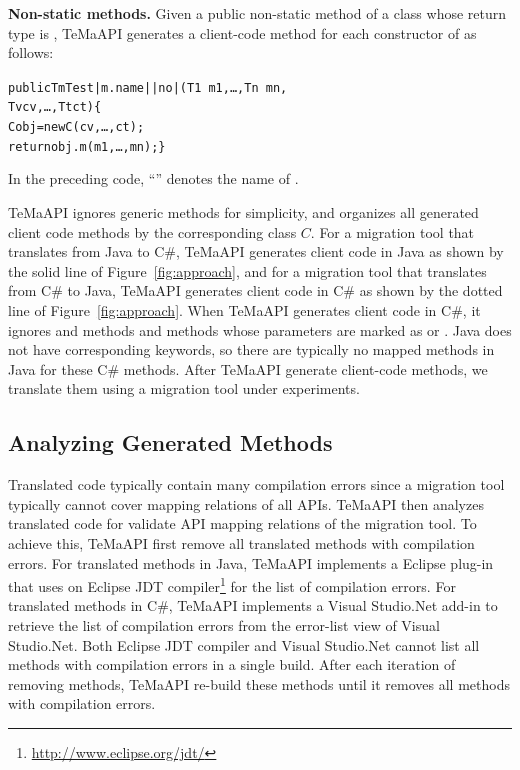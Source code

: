 \textbf{Non-static methods.} Given a public non-static method  of a class  whose return type is , TeMaAPI generates a client-code method for each constructor  of  as follows:
\begin{CodeOut}%
\begin{alltt}
 public Tm Test|m.name||no|(T1\ m1,\ldots, Tn\ mn, 
                            Tv cv, \ldots, Tt ct)\{
   C obj = new C(cv,\ldots, ct);                     
   return obj.m(m1,\ldots, mn); \}
\end{alltt}
\end{CodeOut}

In the preceding code, ``'' denotes the name of . 

TeMaAPI ignores generic methods for simplicity, and organizes all generated client code methods by the corresponding class $C$. For a migration tool that translates from Java to C\#, TeMaAPI generates client code in Java as shown by the solid line of Figure~\ref{fig:approach}, and for a migration tool that translates from C\# to Java, TeMaAPI generates client code in C\# as shown by the dotted line of Figure~\ref{fig:approach}. When TeMaAPI generates client code in C\#, it ignores  and  methods and methods whose parameters are marked as  or . Java does not have corresponding keywords, so there are typically no mapped methods in Java for these C\# methods. After TeMaAPI generate client-code methods, we translate them using a migration tool under experiments.


\subsection{Analyzing Generated Methods}
\label{sec:approach:analyzing}
Translated code typically contain many compilation errors since a migration tool typically cannot cover mapping relations of all APIs. TeMaAPI then analyzes translated code for validate API mapping relations of the migration tool. To achieve this, TeMaAPI first remove all translated methods with compilation errors. For translated methods in Java, TeMaAPI implements a Eclipse plug-in that uses on Eclipse JDT compiler\footnote{\url{http://www.eclipse.org/jdt/}} for the list of compilation errors. For translated methods in C\#, TeMaAPI implements a Visual Studio.Net add-in to retrieve the list of compilation errors from the error-list view of Visual Studio.Net. Both Eclipse JDT compiler and Visual Studio.Net cannot list all methods with compilation errors in a single build. After each iteration of removing methods, TeMaAPI re-build these methods until it removes all methods with compilation errors.


